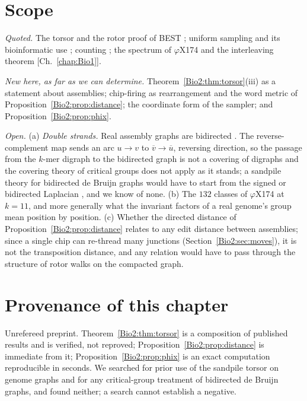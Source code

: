 \section{Scope}\label{Bio2:sec:scope}

\emph{Quoted.} The torsor and the rotor proof of BEST \cite{HLMPPW}; uniform sampling
\cite{CMN,PW,Wilson,CC} and its bioinformatic use \cite{AE,KMUW,uShuffle}; counting
\cite{ABCS,KSP}; the spectrum of $\varphi$X174 and the interleaving theorem [Ch.~\ref{chap:Bio1}].

\emph{New here, as far as we can determine.} Theorem~\ref{Bio2:thm:torsor}(iii) as a statement
about assemblies; chip-firing as rearrangement and the word metric of
Proposition~\ref{Bio2:prop:distance}; the coordinate form of the sampler; and
Proposition~\ref{Bio2:prop:phix}.

\emph{Open.} (a) \emph{Double strands.} Real assembly graphs are bidirected
\cite{KM,MB}. The reverse-complement map sends an arc $u\to v$ to $\overline v\to\overline u$,
reversing direction, so the passage from the $k$-mer digraph to the bidirected graph is not
a covering of digraphs and the covering theory of critical groups \cite{RT} does not apply
as it stands; a sandpile theory for bidirected de Bruijn graphs would have to start from
the signed or bidirected Laplacian \cite{Zaslavsky}, and we know of none. (b) The $132$
classes of $\varphi$X174 at $k=11$, and more generally what the invariant factors of a
real genome's group mean position by position. (c) Whether the directed distance of
Proposition~\ref{Bio2:prop:distance} relates to any edit distance between assemblies; since a
single chip can re-thread many junctions (Section~\ref{Bio2:sec:moves}), it is not the
transposition distance, and any relation would have to pass through the structure of
rotor walks on the compacted graph.

\section*{Provenance of this chapter}

Unrefereed preprint. Theorem~\ref{Bio2:thm:torsor} is a composition of published results and is
verified, not reproved; Proposition~\ref{Bio2:prop:distance} is immediate from it;
Proposition~\ref{Bio2:prop:phix} is an exact computation reproducible in seconds. We searched
for prior use of the sandpile torsor on genome graphs and for any critical-group treatment
of bidirected de Bruijn graphs, and found neither; a search cannot establish a negative.

